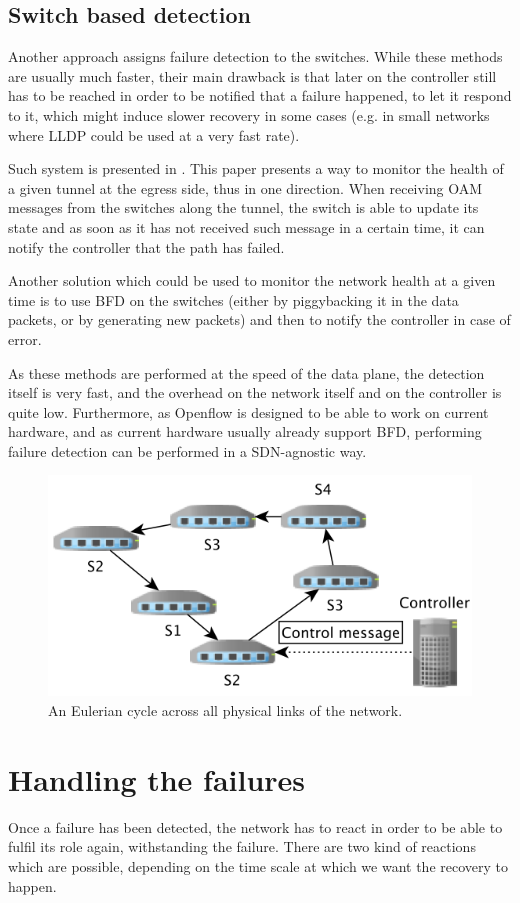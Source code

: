 \documentclass[final]{IEEEtran}
\begin{document}
\subsection{Switch based detection}
Another approach assigns failure detection to the switches. While these methods are usually much faster, their main drawback is that later on the controller still has to be reached in order to be notified that a failure happened, to let it respond to it, which might induce slower recovery in some cases (e.g. in small networks where LLDP could be used at a very fast rate).

Such system is presented in \cite{6364688}. This paper presents a way to monitor the health of a given tunnel at the egress side, thus in one direction. When receiving OAM messages from the switches along the tunnel, the switch is able to update its state and as soon as it has not received such message in a certain time, it can notify the controller that the path has failed.

Another solution which could be used to monitor the network health at a given time is to use BFD\cite{rfc5880} on the switches (either by piggybacking it in the data packets, or by generating new packets) and then to notify the controller in case of error.

As these methods are performed at the speed of the data plane, the detection itself is very fast, and the overhead on the network itself and on the controller is quite low. Furthermore, as Openflow is designed to be able to work on current hardware, and as current hardware usually already support BFD, performing failure detection can be performed in a SDN-agnostic way.

\begin{figure}
	\includegraphics[width=.5\textwidth]{images/euler.png}
	\caption{An Eulerian cycle across all physical links of the network.}
	\label{fig:cycle}
\end{figure}

\section{Handling the failures}
Once a failure has been detected, the network has to react in order to be able to fulfil its role again, withstanding the failure. There are two kind of reactions which are possible, depending on the time scale at which we want the recovery to happen.
\end{document}
